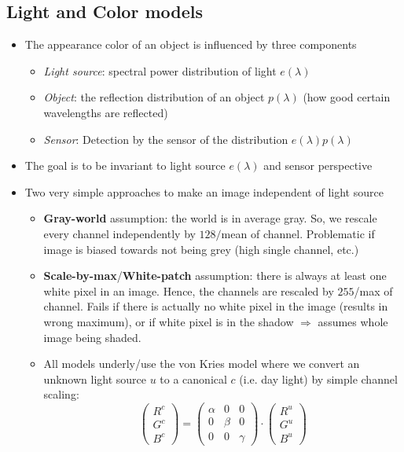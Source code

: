 \subsection{Light and Color models}
\label{sec:color_models}
\begin{itemize}
	\item The appearance color of an object is influenced by three components
	\begin{itemize}
		\item \textit{Light source}: spectral power distribution of light $e(\lambda)$ 
		\item \textit{Object}: the reflection distribution of an object $p(\lambda)$ (how good certain wavelengths are reflected)
		\item \textit{Sensor}: Detection by the sensor of the distribution $e(\lambda) p(\lambda)$
	\end{itemize}
	\item The goal is to be invariant to light source $e(\lambda)$ and sensor perspective
	\item Two very simple approaches to make an image independent of light source
	\begin{itemize}
		\item \textbf{Gray-world} assumption: the world is in average gray. So, we rescale every channel independently by $128/$mean of channel. Problematic if image is biased towards not being grey (high single channel, etc.)
		\item \textbf{Scale-by-max}/\textbf{White-patch} assumption: there is always at least one white pixel in an image. Hence, the channels are rescaled by $255$/max of channel. Fails if there is actually no white pixel in the image (results in wrong maximum), or if white pixel is in the shadow $\Rightarrow$ assumes whole image being shaded.
		\item All models underly/use the von Kries model where we convert an unknown light source $u$ to a canonical $c$ (i.e. day light) by simple channel scaling:
		$$\left(\begin{array}{c}R^c\\G^c\\B^c\end{array}\right) = \left(\begin{array}{ccc}
		\alpha & 0 & 0 \\
		0 & \beta & 0\\
		0 & 0 & \gamma
		\end{array}\right) \cdot \left(\begin{array}{c}R^u\\G^u\\B^u\end{array}\right)$$

\end{itemize}
\end{itemize}
